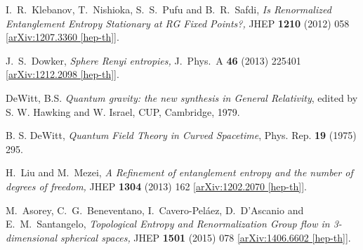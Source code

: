 \documentclass[12pt,a4paper]{article}
\numberwithin{equation}{section}
\begin{document}
\begin{thebibliography}{99}
 I.~R.~Klebanov, T.~Nishioka, S.~S.~Pufu and B.~R.~Safdi,
\textit{Is Renormalized Entanglement Entropy Stationary at RG Fixed Points?,}
JHEP {\bf 1210} (2012) 058
\href{http://arxiv.org/abs/arXiv:1207.3360}{[arXiv:1207.3360 [hep-th]]}.

J.~S.~Dowker,
\textit{Sphere Renyi entropies,}
J.\ Phys.\ A {\bf 46} (2013) 225401
\href{http://arxiv.org/abs/arXiv:1212.2098}{[arXiv:1212.2098 [hep-th]]}.

DeWitt, B.S.
\textit{Quantum gravity: the new synthesis in General Relativity}, edited
by S. W. Hawking and W. Israel, CUP, Cambridge, 1979.

 B. S. DeWitt,
\textit{Quantum Field Theory in Curved Spacetime},
Phys. Rep. {\bf 19} (1975) 295.

H.~Liu and M.~Mezei,
\textit{A Refinement of entanglement entropy and the number of degrees of freedom,}
JHEP {\bf 1304} (2013) 162
\href{http://arxiv.org/abs/arXiv:1202.2070}{[arXiv:1202.2070 [hep-th]]}.

M.~Asorey, C.~G.~Beneventano, I.~Cavero-Pel\'{a}ez, D.~D'Ascanio and E.~M.~Santangelo,
\textit{Topological Entropy and Renormalization Group flow in 3-dimensional spherical spaces,}
JHEP {\bf 1501} (2015) 078
\href{http://arxiv.org/abs/arXiv:1406.6602}{[arXiv:1406.6602 [hep-th]]}.

\end{thebibliography}
\end{document}
